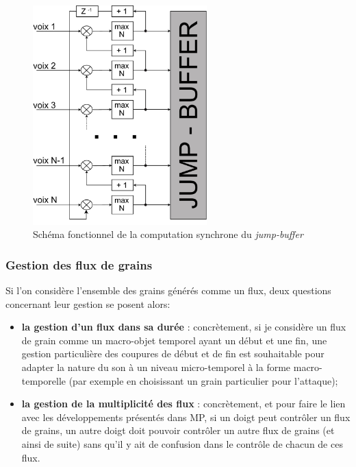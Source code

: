 \begin{figure}[!htbp]
	\captionsetup{format=plain}
	\includegraphics[width=0.6\textwidth]{gfx/04_algorithms/sagrada-jumpBuffer.pdf}
	\caption[Sagrada : schéma fonctionnel de la computation synchrone du \textit{jump-buffer}]{Schéma fonctionnel de la computation synchrone du \textit{jump-buffer}}
	\label{fig:algorithms:sagrada-jumpBuffer}
\end{figure}

\subsubsection{Gestion des flux de grains}

\noindent Si l'on considère l'ensemble des grains générés comme un flux, deux questions concernant leur gestion se posent alors:
\vspace{-1em}
\begin{itemize}[noitemsep]
	\item \textbf{la gestion d'un flux dans sa durée} : concrètement, si je considère un flux de grain comme un macro-objet temporel ayant un début et une fin, une gestion particulière des coupures de début et de fin est souhaitable pour adapter la nature du son à un niveau micro-temporel à la forme macro-temporelle (par exemple en choisissant un grain particulier pour l'attaque);
	\item \textbf{la gestion de la multiplicité des flux} : concrètement, et pour faire le lien avec les développements présentés dans MP, si un doigt peut contrôler un flux de grains, un autre doigt doit pouvoir contrôler un autre flux de grains (et ainsi de suite) sans qu'il y ait de confusion dans le contrôle de chacun de ces flux.
\end{itemize}

